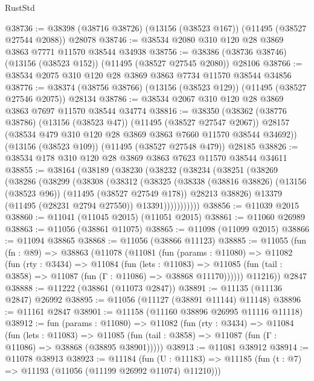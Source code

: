 \begin{lexlean}{RustStd}
\begin{coremodule}
@38736 := @38398 (@38716 @38726) (@13156 (@38523 @167)) (@11495 (@38527 @27544 @2088)) @28078
@38746 := @38534 @2080 @310 @120 @28 @3869 @3863 @7771 @11570 @38544 @34938
@38756 := @38386 (@38736 @38746) (@13156 (@38523 @152)) (@11495 (@38527 @27545 @2080)) @28106
@38766 := @38534 @2075 @310 @120 @28 @3869 @3863 @7734 @11570 @38544 @34856
@38776 := @38374 (@38756 @38766) (@13156 (@38523 @129)) (@11495 (@38527 @27546 @2075)) @28134
@38786 := @38534 @2067 @310 @120 @28 @3869 @3863 @7697 @11570 @38544 @34774
@38816 := @38350
    (@38362
      (@38776 @38786)
      (@13156 (@38523 @47))
      (@11495 (@38527 @27547 @2067))
      @28157
      (@38534 @479 @310 @120 @28 @3869 @3863 @7660 @11570 @38544 @34692))
    (@13156 (@38523 @109))
    (@11495 (@38527 @27548 @479))
    @28185
@38826 := @38534 @178 @310 @120 @28 @3869 @3863 @7623 @11570 @38544 @34611
@38855 := @38164
    (@38189
      (@38230
        (@38232
          (@38234
            (@38251
              (@38269
                (@38286
                  (@38299
                    (@38308
                      (@38312
                        (@38325
                          (@38338
                            (@38816 @38826)
                            (@13156 (@38523 @96))
                            (@11495 (@38527 @27549 @178))
                            @28213
                            @38826)
                          @13379
                          (@11495 (@28231 @2794 @27550))
                          @13391)))))))))))
@38856 := @11039 @2015
@38860 := @11041 (@11045 @2015) (@11051 @2015)
@38861 := @11060 @26989
@38863 := @11056 (@38861 @11075)
@38865 := @11098 (@11099 @2015)
@38866 := @11094 @38865
@38868 := @11056 (@38866 @11123)
@38885 := @11055
    (fun (fn : @89) =>
    @38863
      (@11078
        (@11081
          (fun (params : @11080) =>
          @11082
            (fun (rty : @3434) =>
            @11084
              (fun (lets : @11083) =>
              @11085 (fun (tail : @3858) => @11087 (fun (Γ : @11086) => @38868 @11170))))))
        @11216))
    @2847
@38888 := @11222 (@38861 (@11073 @2847))
@38891 := @11135 (@11136 @2847) @26992
@38895 := @11056 (@11127 (@38891 @11144) @11148)
@38896 := @11161 @2847
@38901 := @11158 (@11160 @38896 @26995 @11116 @11118)
@38912 := fun (params : @11080) =>
  @11082
    (fun (rty : @3434) =>
    @11084
      (fun (lets : @11083) =>
      @11085 (fun (tail : @3858) => @11087 (fun (Γ : @11086) => @38868 (@38895 @38901)))))
@38913 := @11081 @38912
@38914 := @11078 @38913
@38923 := @11184
    (fun (U : @11183) => @11185 (fun (t : @7) => @11193 (@11056 (@11199 @26992 @11074) @11210)))

\end{coremodule}
\end{lexlean}
